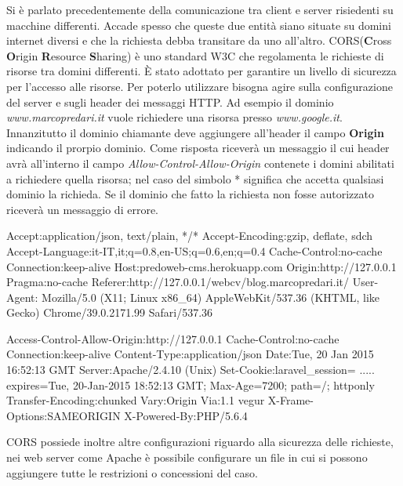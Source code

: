 Si è parlato precedentemente della comunicazione tra client e server risiedenti su macchine differenti. Accade spesso che queste due entità siano situate su domini internet diversi e che la richiesta debba transitare da uno all'altro. CORS(\textbf{C}ross \textbf{O}rigin \textbf{R}esource \textbf{S}haring) è uno standard W3C che regolamenta le richieste di risorse tra domini differenti. È stato adottato per garantire un livello di sicurezza per l'accesso alle risorse. Per poterlo utilizzare bisogna agire sulla configurazione del server e sugli header dei messaggi HTTP.
Ad esempio il dominio \emph{www.marcopredari.it} vuole richiedere una risorsa presso \emph{www.google.it}. Innanzitutto il dominio chiamante deve aggiungere all'header il campo \textbf{Origin} indicando il prorpio dominio. Come risposta riceverà un messaggio il cui header avrà all'interno il campo \textit{Allow-Control-Allow-Origin} contenete i domini abilitati a richiedere quella risorsa; nel caso del simbolo * significa che accetta qualsiasi dominio la richieda. Se il dominio che fatto la richiesta non fosse autorizzato riceverà un messaggio di errore. \cite{web:cors}

\begin{code}[caption={esempio di richiesta HTTP utilizzando CORS}, label={lst:CORSrequest}]
	Accept:application/json, text/plain, */*
	Accept-Encoding:gzip, deflate, sdch
	Accept-Language:it-IT,it;q=0.8,en-US;q=0.6,en;q=0.4
	Cache-Control:no-cache
	Connection:keep-alive
	Host:predoweb-cms.herokuapp.com
	Origin:http://127.0.0.1
	Pragma:no-cache
	Referer:http://127.0.0.1/webcv/blog.marcopredari.it/
	User-Agent: Mozilla/5.0 (X11; Linux x86_64) 
			    AppleWebKit/537.36 (KHTML, like Gecko) 
			    Chrome/39.0.2171.99 Safari/537.36
\end{code}

\begin{code}[caption={esempio di risposta dal server che utilizza CORS}, label={lst:CORSanswer}]
	Access-Control-Allow-Origin:http://127.0.0.1
	Cache-Control:no-cache
	Connection:keep-alive
	Content-Type:application/json
	Date:Tue, 20 Jan 2015 16:52:13 GMT
	Server:Apache/2.4.10 (Unix)
	Set-Cookie:laravel_session= .....
			   expires=Tue, 20-Jan-2015 18:52:13 GMT; 
			   Max-Age=7200; 
			   path=/; 
			   httponly
	Transfer-Encoding:chunked
	Vary:Origin
	Via:1.1 vegur
	X-Frame-Options:SAMEORIGIN
	X-Powered-By:PHP/5.6.4
\end{code}

CORS possiede inoltre altre configurazioni riguardo alla sicurezza delle richieste, nei web server come Apache è possibile configurare un file in cui si possono aggiungere tutte le restrizioni o concessioni del caso.

